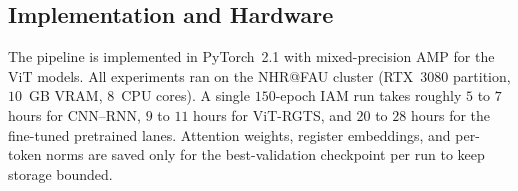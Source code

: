 \subsection{Implementation and Hardware}
\label{sec:impl}

The pipeline is implemented in PyTorch~2.1 with mixed-precision AMP for the ViT models. All experiments ran on the NHR@FAU cluster (RTX~3080 partition, $10$~GB VRAM, $8$~CPU cores). A single $150$-epoch IAM run takes roughly $5$ to $7$ hours for CNN--RNN, $9$ to $11$ hours for ViT-RGTS, and $20$ to $28$ hours for the fine-tuned pretrained lanes. Attention weights, register embeddings, and per-token norms are saved only for the best-validation checkpoint per run to keep storage bounded.
